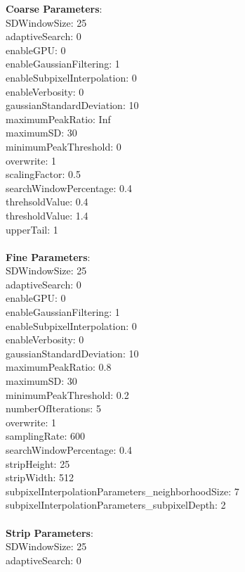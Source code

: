 \documentclass[11pt]{article}
\begin{document}
\textbf{Coarse Parameters}: \\
SDWindowSize: 25\\
adaptiveSearch: 0\\
enableGPU: 0\\
enableGaussianFiltering: 1\\
enableSubpixelInterpolation: 0\\
enableVerbosity: 0\\
gaussianStandardDeviation: 10\\
maximumPeakRatio: Inf\\
maximumSD: 30\\
minimumPeakThreshold: 0\\
overwrite: 1\\
scalingFactor: 0.5\\
searchWindowPercentage: 0.4\\
threhsoldValue: 0.4\\
thresholdValue: 1.4\\
upperTail: 1\\
\\
\textbf{Fine Parameters}: \\
SDWindowSize: 25\\
adaptiveSearch: 0\\
enableGPU: 0\\
enableGaussianFiltering: 1\\
enableSubpixelInterpolation: 0\\
enableVerbosity: 0\\
gaussianStandardDeviation: 10\\
maximumPeakRatio: 0.8\\
maximumSD: 30\\
minimumPeakThreshold: 0.2\\
numberOfIterations: 5\\
overwrite: 1\\
samplingRate: 600\\
searchWindowPercentage: 0.4\\
stripHeight: 25\\
stripWidth: 512\\
subpixelInterpolationParameters\_neighborhoodSize: 7\\
subpixelInterpolationParameters\_subpixelDepth: 2\\
\\
\textbf{Strip Parameters}: \\
SDWindowSize: 25\\
adaptiveSearch: 0\\
\end{document}
